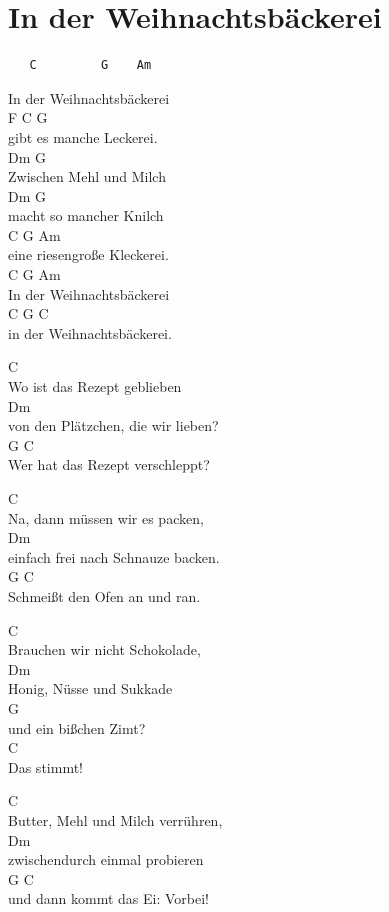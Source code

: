 \documentclass[
  letterpaper,
]{scrbook}
\begin{document}
\hypertarget{in-der-weihnachtsbuxe4ckerei}{%
\chapter{In der Weihnachtsbäckerei}\label{in-der-weihnachtsbuxe4ckerei}}

\begin{verbatim}
   C         G    Am
\end{verbatim}

In der Weihnachtsbäckerei\\
F C G\\
gibt es manche Leckerei.\\
Dm G\\
Zwischen Mehl und Milch\\
Dm G\\
macht so mancher Knilch\\
C G Am\\
eine riesengroße Kleckerei.\\
C G Am\\
In der Weihnachtsbäckerei\\
C G C\\
in der Weihnachtsbäckerei.

C\\
Wo ist das Rezept geblieben\\
Dm\\
von den Plätzchen, die wir lieben?\\
G C\\
Wer hat das Rezept verschleppt?

C\\
Na, dann müssen wir es packen,\\
Dm\\
einfach frei nach Schnauze backen.\\
G C\\
Schmeißt den Ofen an und ran.

C\\
Brauchen wir nicht Schokolade,\\
Dm\\
Honig, Nüsse und Sukkade\\
G\\
und ein bißchen Zimt?\\
C\\
Das stimmt!

C\\
Butter, Mehl und Milch verrühren,\\
Dm\\
zwischendurch einmal probieren\\
G C\\
und dann kommt das Ei: Vorbei!
\end{document}
